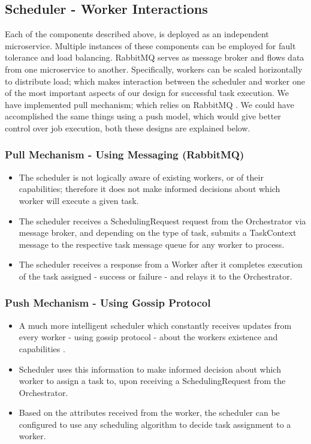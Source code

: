 \documentclass[sigconf]{acmart}
\begin{document}
\subsection {Scheduler - Worker Interactions}
Each of the components described above, is deployed as an independent microservice. Multiple instances of these components can be employed for fault tolerance and load balancing. RabbitMQ serves as message broker and flows data from one microservice to another. Specifically, workers can be scaled horizontally to distribute load; which makes interaction between the scheduler and worker one of the most important aspects of our design for successful task execution. We have implemented pull mechanism; which relies on RabbitMQ \cite{sadooghi2014achieving}. We could have accomplished the same things using a push model, which would give better control over job execution, both these designs are explained below.

\subsubsection{Pull Mechanism - Using Messaging (RabbitMQ)}
\begin{itemize}
\item The scheduler is not logically aware of existing workers, or of their capabilities; therefore it does not make informed decisions about which worker will execute a given task.
\item The scheduler receives a SchedulingRequest request from the Orchestrator via message broker, and depending on the type of task, submits a TaskContext message to the respective task message queue for any worker to process.
\item The scheduler receives a response from a Worker after it completes execution of the task assigned - success or failure - and relays it to the Orchestrator.
\end{itemize}

\subsubsection{Push Mechanism - Using Gossip Protocol}
\begin{itemize}
\item A much more intelligent scheduler which constantly receives updates from every worker - using gossip protocol - about the workers existence and capabilities \cite{kermarrec2007gossiping}.
\item Scheduler uses this information to make informed decision about which worker to assign a task to, upon receiving a SchedulingRequest from the Orchestrator.
\item Based on the attributes received from the worker, the scheduler can be configured to use any scheduling algorithm to decide task assignment to a worker.
\end{itemize}
\end{document}
